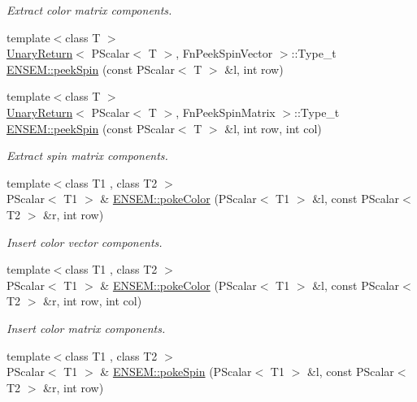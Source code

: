 \begin{DoxyCompactItemize}
\begin{DoxyCompactList}\small\item\em Extract color matrix components. \end{DoxyCompactList}\item 
{\footnotesize template$<$class T $>$ }\\\mbox{\hyperlink{structUnaryReturn}{Unary\+Return}}$<$ P\+Scalar$<$ T $>$, Fn\+Peek\+Spin\+Vector $>$\+::Type\+\_\+t \mbox{\hyperlink{group__primscalar_gae58d7282a3d7b7cb78a43c300314fd16}{E\+N\+S\+E\+M\+::peek\+Spin}} (const P\+Scalar$<$ T $>$ \&l, int row)
\item 
{\footnotesize template$<$class T $>$ }\\\mbox{\hyperlink{structUnaryReturn}{Unary\+Return}}$<$ P\+Scalar$<$ T $>$, Fn\+Peek\+Spin\+Matrix $>$\+::Type\+\_\+t \mbox{\hyperlink{group__primscalar_gae6a011ab6458165e95b6e647d6684b7b}{E\+N\+S\+E\+M\+::peek\+Spin}} (const P\+Scalar$<$ T $>$ \&l, int row, int col)
\begin{DoxyCompactList}\small\item\em Extract spin matrix components. \end{DoxyCompactList}\item 
{\footnotesize template$<$class T1 , class T2 $>$ }\\P\+Scalar$<$ T1 $>$ \& \mbox{\hyperlink{group__primscalar_ga7e556b2cf2409e6342b4591b4d4fb83f}{E\+N\+S\+E\+M\+::poke\+Color}} (P\+Scalar$<$ T1 $>$ \&l, const P\+Scalar$<$ T2 $>$ \&r, int row)
\begin{DoxyCompactList}\small\item\em Insert color vector components. \end{DoxyCompactList}\item 
{\footnotesize template$<$class T1 , class T2 $>$ }\\P\+Scalar$<$ T1 $>$ \& \mbox{\hyperlink{group__primscalar_ga540606e7a9a4e2fbb97da4a95bc1c21f}{E\+N\+S\+E\+M\+::poke\+Color}} (P\+Scalar$<$ T1 $>$ \&l, const P\+Scalar$<$ T2 $>$ \&r, int row, int col)
\begin{DoxyCompactList}\small\item\em Insert color matrix components. \end{DoxyCompactList}\item 
{\footnotesize template$<$class T1 , class T2 $>$ }\\P\+Scalar$<$ T1 $>$ \& \mbox{\hyperlink{group__primscalar_gaef0821cb16093e96134a98e5a765c45a}{E\+N\+S\+E\+M\+::poke\+Spin}} (P\+Scalar$<$ T1 $>$ \&l, const P\+Scalar$<$ T2 $>$ \&r, int row)

\end{DoxyCompactItemize}
